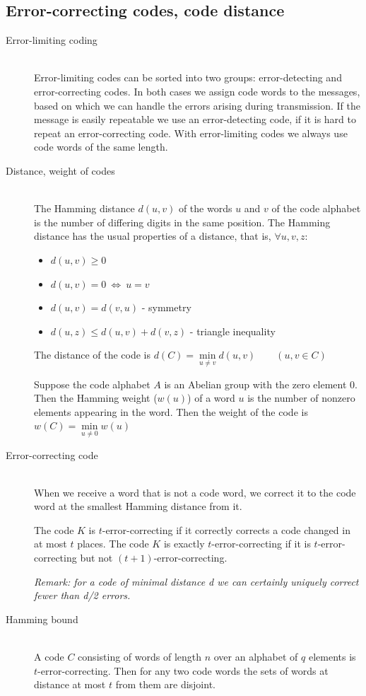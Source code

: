 \documentclass[margin=0px]{article}
\begin{document}
\subsection{Error-correcting codes, code distance}
\begin{description}
    \item[Error-limiting coding] \hfill \\
        Error-limiting codes can be sorted into two groups: error-detecting and error-correcting codes. In both cases we assign code words to the messages, based on which we can handle the errors arising during transmission. If the message is easily repeatable we use an error-detecting code, if it is hard to repeat an error-correcting code. With error-limiting codes we always use code words of the same length.
    \item[Distance, weight of codes] \hfill \\
        The Hamming distance $d(u,v)$ of the words $u$ and $v$ of the code alphabet is the number of differing digits in the same position. The Hamming distance has the usual properties of a distance, that is, $\forall u,v,z$:
        \begin{itemize}
            \item $d(u,v) \geq 0$
            \item $d(u,v) = 0 \ \Longleftrightarrow \ u = v$
            \item $d(u,v) = d(v,u)$ - symmetry
            \item $d(u,z) \leq d(u,v)+d(v,z)$ - triangle inequality
        \end{itemize}
        The distance of the code is $d(C) = \min\limits_{u\neq v}d(u,v) \qquad (u,v \in C)$

        Suppose the code alphabet $A$ is an Abelian group with the zero element $0$. Then the Hamming weight ($w(u)$) of a word $u$ is the number of nonzero elements appearing in the word. Then the weight of the code is $w(C)  = \min\limits_{u\neq 0}w(u)$
    \item[Error-correcting code] \hfill \\
        When we receive a word that is not a code word, we correct it to the code word at the smallest Hamming distance from it.

        The code $K$ is $t$-error-correcting if it correctly corrects a code changed in at most $t$ places. The code $K$ is exactly $t$-error-correcting if it is $t$-error-correcting but not $(t+1)$-error-correcting.

        \textit{Remark: for a code of minimal distance d we can certainly uniquely correct fewer than d/2 errors.}
    \item[Hamming bound] \hfill \\
        A code $C$ consisting of words of length $n$ over an alphabet of $q$ elements is $t$-error-correcting. Then for any two code words the sets of words at distance at most $t$ from them are disjoint.


\end{description}
\end{document}
